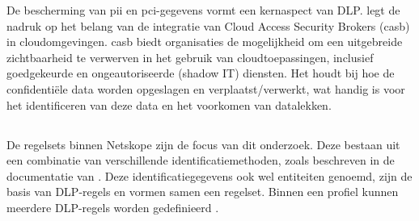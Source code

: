 De bescherming van \gls{pii} en \gls{pci}-gegevens vormt een kernaspect van DLP. \textcite{Wason2020CASB} legt de nadruk op het belang van de integratie van Cloud Access Security Brokers (\gls{casb}) in cloudomgevingen. 
\gls{casb} biedt organisaties de mogelijkheid om een uitgebreide zichtbaarheid te verwerven in het gebruik van cloudtoepassingen, inclusief goedgekeurde en ongeautoriseerde (shadow IT) diensten. 
Het houdt bij hoe de confidentiële data worden opgeslagen en verplaatst/verwerkt, wat handig is voor het identificeren van deze data en het voorkomen van datalekken.

\subsection{}
\label{subsec:regelsets-literatuurstudie}

De regelsets binnen Netskope zijn de focus van dit onderzoek. Deze bestaan uit een combinatie van verschillende identificatiemethoden, zoals beschreven in de documentatie van \textcite{Netskope2025DLP}. 
Deze identificatiegegevens ook wel entiteiten genoemd, zijn de basis van DLP-regels en vormen samen een regelset. 
Binnen een profiel kunnen meerdere DLP-regels worden gedefinieerd \autocite{Netskope2025Profiles}.



